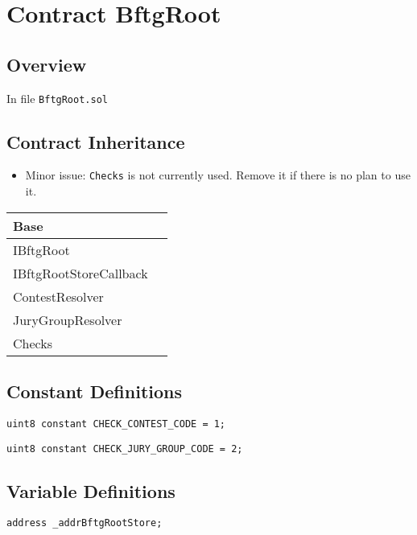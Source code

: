 
\chapter{Contract BftgRoot}

\minitoc

\section{Overview}


In file {\tt BftgRoot.sol}

\section{Contract Inheritance}

\begin{itemize}
\item Minor issue: {\tt Checks} is not currently used. Remove it if
  there is no plan to use it.
\end{itemize}

\noindent\begin{tabular}{|l|p{5cm}|}\hline
Base & \\\hline
IBftgRoot & \\\hline
IBftgRootStoreCallback & \\\hline
ContestResolver & \\\hline
JuryGroupResolver & \\\hline
Checks & \\\hline
\end{tabular}


\section{Constant Definitions}


\begin{lstlisting}[firstnumber=18]
    uint8 constant CHECK_CONTEST_CODE = 1;
\end{lstlisting}

\begin{lstlisting}[firstnumber=19]
    uint8 constant CHECK_JURY_GROUP_CODE = 2;
\end{lstlisting}

\section{Variable Definitions}


\begin{lstlisting}[firstnumber=34]
    address _addrBftgRootStore;
\end{lstlisting}


